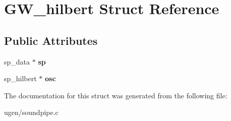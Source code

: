 \hypertarget{structGW__hilbert}{}\section{G\+W\+\_\+hilbert Struct Reference}
\label{structGW__hilbert}
\subsection*{Public Attributes}
\begin{DoxyCompactItemize}
\item 
\hypertarget{structGW__hilbert_a4a5175bc23ba1336dde90ce3204c3d04}{}\label{structGW__hilbert_a4a5175bc23ba1336dde90ce3204c3d04} 
sp\+\_\+data $\ast$ {\bfseries sp}
\item 
\hypertarget{structGW__hilbert_a7dcf7a3282a9e4fcc2261866c3ff433b}{}\label{structGW__hilbert_a7dcf7a3282a9e4fcc2261866c3ff433b} 
sp\+\_\+hilbert $\ast$ {\bfseries osc}
\end{DoxyCompactItemize}


The documentation for this struct was generated from the following file\+:\begin{DoxyCompactItemize}
\item 
ugen/soundpipe.\+c\end{DoxyCompactItemize}

